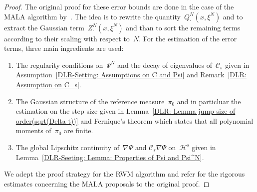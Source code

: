 \begin{proof}
 The original proof for these error bounds are done in the case of  the MALA algorithm by~\autocite[Lemma 4.4]{Pillai2012}. The idea is to rewrite the quantity~$Q^N_{\cdot} (x,  \xi^N)$ and to extract the Gaussian term~$Z^N_{\cdot} (x, \xi^N)$ and than to sort the remaining terms according to their scaling with respect to~$N$. For the estimation of the error terms, three main ingredients are used:
 \begin{enumerate}
  \item The regularity conditions on~$\Psi^N$ and the decay of eigenvalues of~$\mathcal{C}_s$ given in Assumption~\ref{DLR-Setting: Assumptions on C and Psi} and Remark~\ref{DLR: Assumption on C_s}.
  \item The Gaussian structure of the reference measure~$\pi_0$ and in particluar the estimation on the step size given in Lemma~\ref{DLR: Lemma jump size of order(sqrt(Delta t))} and Fernique's theorem which states that all polynomial moments of~$\pi_0$ are finite.
  \item The global Lipschitz continuity of~$\nabla \Psi$ and $\mathcal{C}_s \nabla \Psi$ on~$\mathcal{H}^s$ given in Lemma~\ref{DLR-Seeting: Lemma: Properties of Psi and Psi^N}.
 \end{enumerate}
 We adept the proof strategy for the RWM algorithm and refer for the rigorous estimates concerning the MALA proposals to the original proof. 
 

\end{proof}
